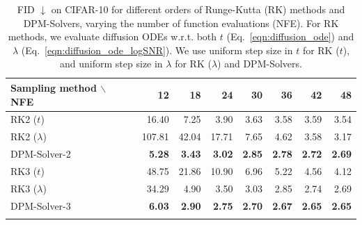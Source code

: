 
\begin{table}[t]
    \centering
    \caption{\small{FID $\downarrow$ on CIFAR-10 for different orders of Runge-Kutta (RK) methods and DPM-Solvers, varying the number of function evaluations (NFE). For RK methods, we evaluate diffusion ODEs w.r.t. both $t$ (Eq.~\eqref{eqn:diffusion_ode}) and $\lambda$ (Eq.~\eqref{eqn:diffusion_ode_logSNR}). We use uniform step size in $t$ for RK ($t$), and uniform step size in $\lambda$ for RK ($\lambda$) and DPM-Solvers.}}
    \label{tab:RK_compare}
        \small{
    \begin{tabular}{lrrrrrrr}
    \toprule
      Sampling method $\backslash$ NFE & 12 & 18 & 24 & 30 & 36 & 42 & 48\\
    \midrule
      RK2 ($t$) & 16.40 & 7.25 & 3.90 & 3.63 & 3.58 & 3.59 & 3.54 \\
      RK2 ($\lambda$) & 107.81 & 42.04 & 17.71 & 7.65 & 4.62 & 3.58 & 3.17 \\
      DPM-Solver-2 & \textbf{5.28} & \textbf{3.43} & \textbf{3.02} & \textbf{2.85} & \textbf{2.78} & \textbf{2.72} & \textbf{2.69} \\
    \arrayrulecolor{black!30}\midrule
      RK3 ($t$) & 48.75 & 21.86 & 10.90 & 6.96 & 5.22 & 4.56 & 4.12 \\
      RK3 ($\lambda$) & 34.29 & 4.90 & 3.50 & 3.03 & 2.85 & 2.74 & 2.69 \\
      DPM-Solver-3 & \textbf{6.03} & \textbf{2.90} & \textbf{2.75} & \textbf{2.70} & \textbf{2.67} & \textbf{2.65} & \textbf{2.65} \\
    \arrayrulecolor{black}\bottomrule
    \end{tabular}
    }
\end{table}


